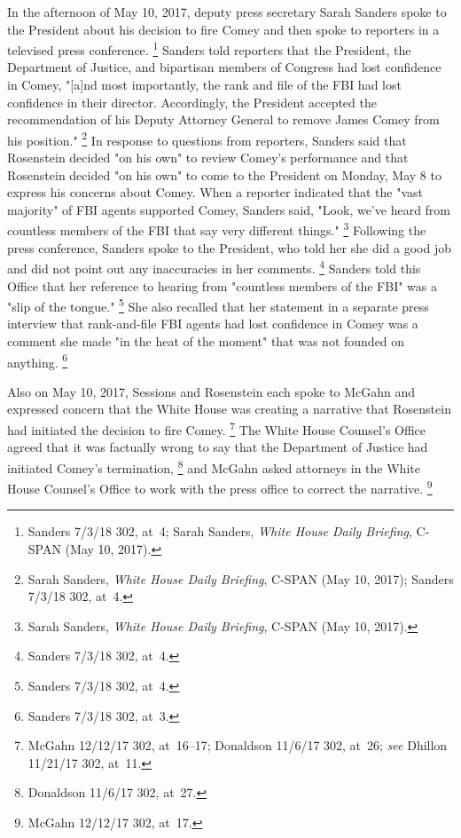 {In the afternoon of May 10, 2017, deputy press secretary Sarah Sanders spoke to the President about his decision to fire Comey and then spoke to reporters in a televised press conference.%
\footnote{Sanders 7/3/18 302, at~4;
Sarah Sanders, \textit{White House Daily Briefing}, C-SPAN (May 10, 2017).}
Sanders told reporters that the President, the Department of Justice, and bipartisan members of Congress had lost confidence in Comey, "[a]nd most importantly, the rank and file of the FBI had lost confidence in their director.
Accordingly, the President accepted the recommendation of his Deputy Attorney General to remove James Comey from his position."%
\footnote{Sarah Sanders, \textit{White House Daily Briefing}, C-SPAN (May 10, 2017);
Sanders 7/3/18 302, at~4.}
In response to questions from reporters, Sanders said that Rosenstein decided "on his own" to review Comey's performance and that Rosenstein decided "on his own" to come to the President on Monday, May 8 to express his concerns about Comey.
When a reporter indicated that the "vast majority" of FBI agents supported Comey, Sanders said, "Look, we've heard from countless members of the FBI that say very different things."%
\footnote{Sarah Sanders, \textit{White House Daily Briefing}, C-SPAN (May 10, 2017).}
Following the press conference, Sanders spoke to the President, who told her she did a good job and did not point out any inaccuracies in her comments.%
\footnote{Sanders 7/3/18 302, at~4.}
Sanders told this Office that her reference to hearing from "countless members of the FBI" was a "slip of the tongue."%
\footnote{Sanders 7/3/18 302, at~4.}
She also recalled that her statement in a separate press interview that rank-and-file FBI agents had lost confidence in Comey was a comment she made "in the heat of the moment" that was not founded on anything.%
\footnote{Sanders 7/3/18 302, at~3.}

Also on May 10, 2017, Sessions and Rosenstein each spoke to McGahn and expressed concern that the White House was creating a narrative that Rosenstein had initiated the decision to fire Comey.%
\footnote{McGahn 12/12/17 302, at~16--17;
Donaldson 11/6/17 302, at~26;
\textit{see} Dhillon 11/21/17 302, at~11.}
The White House Counsel's Office agreed that it was factually wrong to say that the Department of Justice had initiated Comey's termination,%
\footnote{Donaldson 11/6/17 302, at~27.}
and McGahn asked attorneys in the White House Counsel's Office to work with the press office to correct the narrative.%
\footnote{McGahn 12/12/17 302, at~17.}

}
